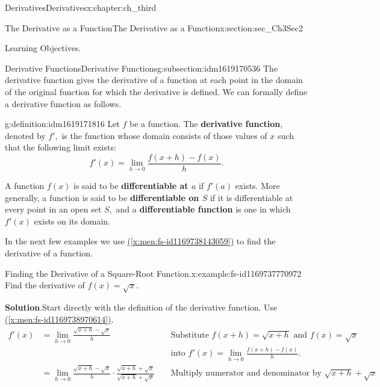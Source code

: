\documentclass[oneside,10pt,]{book}
\newcommand{\blocktitlefont}{\relax}
\newcommand{\xreffont}{\relax}
\newcommand{\terminology}[1]{\textbf{#1}}
\numberwithin{equation}{section}
\newcommand{\amp}{&}
\begin{document}
\begin{chapterptx}{Derivatives}{}{Derivatives}{}{}{x:chapter:ch_third}
\begin{sectionptx}{The Derivative as a Function}{}{The Derivative as a Function}{}{}{x:section:sec_Ch3Sec2}
\begin{introduction}{Learning Objectives.}
\end{introduction}%
%
%
\typeout{************************************************}
\typeout{************************************************}
%
\begin{subsectionptx}{Derivative Functions}{}{Derivative Functions}{}{}{g:subsection:idm1619170536}
The derivative function gives the derivative of a function at each point in the domain of the original function for which the derivative is defined. We can formally define a derivative function as follows.%
\begin{definition}{}{g:definition:idm1619171816}%
Let \(f\) be a function. The \terminology{derivative function}, denoted by \(f',\) is the function whose domain consists of those values of \(x\) such that the following limit exists:%
%
\begin{equation}
f'(x)=\lim_{h\to 0}\frac{f(x+h)-f(x)}{h}.\label{x:men:fs-id1169738143059}
\end{equation}
\end{definition}
A function \(f(x)\) is said to be \terminology{differentiable at \(a\)} if \(f'(a)\) exists. More generally, a function is said to be \terminology{differentiable on \(S\)} if it is differentiable at every point in an open set \(S,\) and a \terminology{differentiable function} is one in which \(f'(x)\) exists on its domain.%
\par
In the next few examples we use \hyperref[x:men:fs-id1169738143059]{({\xreffont\ref{x:men:fs-id1169738143059}})} to find the derivative of a function.%
\begin{example}{Finding the Derivative of a Square-Root Function.}{x:example:fs-id1169737770972}%
Find the derivative of \(f(x)=\sqrt{x}.\)%
\par\smallskip%
\noindent\textbf{\blocktitlefont Solution}.\hypertarget{g:solution:idm1619161704}{}\quad{}Start directly with the definition of the derivative function. Use \hyperref[x:men:fs-id1169738970614]{({\xreffont\ref{x:men:fs-id1169738970614}})}.%
%
\begin{align*}
f'(x)\amp=\lim_{h\to 0}\frac{\sqrt{x+h}-\sqrt{x}}{h}\amp \amp \text{ Substitute } f(x+h)=\sqrt{x+h} \text{ and } f(x)=\sqrt{x}\\
\amp \amp \amp \text{ into } f'(x)=\lim_{h\to 0}\frac{f(x+h)-f(x)}{h}.\\
\amp=\lim_{h\to 0}\frac{\sqrt{x+h}-\sqrt{x}}{h}\cdot \frac{\sqrt{x+h}+\sqrt{x}}{\sqrt{x+h}+\sqrt{x}}\amp \amp\text{ Multiply numerator and denominator by }\sqrt{x+h}+\sqrt{x} \\

\end{align*}
\end{example}
\end{subsectionptx}
\end{sectionptx}
\end{chapterptx}
\end{document}
